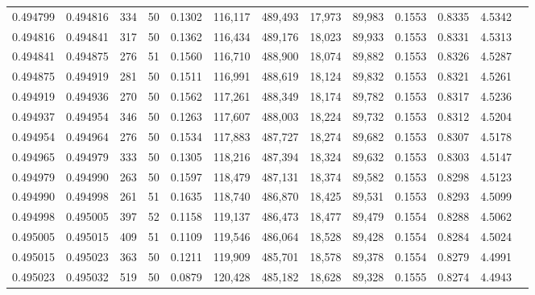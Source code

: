 \begin{tabular}{rrrrrrrrrrrrr}
0.494799 & 0.494816 & 334 &  50 &                                     0.1302 & 116,117 & 489,493 &  17,973 &  89,983 & 0.1553 & 0.8335 & 4.5342 \\
0.494816 & 0.494841 & 317 &  50 &                                     0.1362 & 116,434 & 489,176 &  18,023 &  89,933 & 0.1553 & 0.8331 & 4.5313 \\
0.494841 & 0.494875 & 276 &  51 &                                     0.1560 & 116,710 & 488,900 &  18,074 &  89,882 & 0.1553 & 0.8326 & 4.5287 \\
0.494875 & 0.494919 & 281 &  50 &                                     0.1511 & 116,991 & 488,619 &  18,124 &  89,832 & 0.1553 & 0.8321 & 4.5261 \\
0.494919 & 0.494936 & 270 &  50 &                                     0.1562 & 117,261 & 488,349 &  18,174 &  89,782 & 0.1553 & 0.8317 & 4.5236 \\
0.494937 & 0.494954 & 346 &  50 &                                     0.1263 & 117,607 & 488,003 &  18,224 &  89,732 & 0.1553 & 0.8312 & 4.5204 \\
0.494954 & 0.494964 & 276 &  50 &                                     0.1534 & 117,883 & 487,727 &  18,274 &  89,682 & 0.1553 & 0.8307 & 4.5178 \\
0.494965 & 0.494979 & 333 &  50 &                                     0.1305 & 118,216 & 487,394 &  18,324 &  89,632 & 0.1553 & 0.8303 & 4.5147 \\
0.494979 & 0.494990 & 263 &  50 &                                     0.1597 & 118,479 & 487,131 &  18,374 &  89,582 & 0.1553 & 0.8298 & 4.5123 \\
0.494990 & 0.494998 & 261 &  51 &                                     0.1635 & 118,740 & 486,870 &  18,425 &  89,531 & 0.1553 & 0.8293 & 4.5099 \\
0.494998 & 0.495005 & 397 &  52 &                                     0.1158 & 119,137 & 486,473 &  18,477 &  89,479 & 0.1554 & 0.8288 & 4.5062 \\
0.495005 & 0.495015 & 409 &  51 &                                     0.1109 & 119,546 & 486,064 &  18,528 &  89,428 & 0.1554 & 0.8284 & 4.5024 \\
0.495015 & 0.495023 & 363 &  50 &                                     0.1211 & 119,909 & 485,701 &  18,578 &  89,378 & 0.1554 & 0.8279 & 4.4991 \\
0.495023 & 0.495032 & 519 &  50 &                                     0.0879 & 120,428 & 485,182 &  18,628 &  89,328 & 0.1555 & 0.8274 & 4.4943 \\

\end{tabular}
